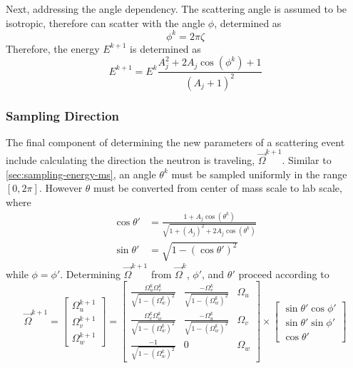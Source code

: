 Next, addressing the angle dependency. The scattering angle is assumed to be isotropic, therefore can scatter with the angle $\phi$, determined as
\begin{equation}
    \phi^k = 2\pi\zeta
\end{equation}
Therefore, the energy $E^{k+1}$ is determined as
\begin{equation}
    E^{k+1} = E^{k} \frac{A_j^{2} + 2A_{j}\cos{\left(\phi^{k}\right) + 1}}{\left( A_{j} + 1 \right)^2}
\end{equation}

\subsubsection{Sampling Direction}
The final component of determining the new parameters of a scattering event include calculating the direction the neutron is traveling, $\overrightarrow{\Omega}^{k+1}$. Similar to \autoref{sec:sampling-energy-ms}, an angle $\theta^k$ must be sampled uniformly in the range $[0,2\pi]$. However $\theta$ must be converted from center of mass scale to lab scale, where
\begin{align}
    \cos{\theta'} &= \frac{1 + A_j \cos{\left( \theta^k \right)}}{\sqrt{1 + \left( A_j\right)^2 + 2A_j\cos{\left(\theta^k \right)}}} \\
    \sin{\theta'} &= \sqrt{1 - \left( \cos{\theta'} \right)^2}
\end{align}
while $\phi=\phi'$.
Determining $\overrightarrow{\Omega}^{k+1}$ from $\overrightarrow{\Omega}^{k}$, $\phi'$, and $\theta'$ proceed according to
\begin{equation}
    \label{eq:direction-calculation-ms}
    \overrightarrow{\Omega}^{k+1} = \begin{bmatrix}
        \Omega^{k+1}_u \\[8pt]
        \Omega^{k+1}_v \\[8pt]
        \Omega^{k+1}_w
    \end{bmatrix}
    = \begin{bmatrix}
        \frac{\Omega_{u}^{k} \Omega_{v}^{k}} { \sqrt{1 - \left(\Omega_{w}^{k}\right)^2 }} &
        \frac{-\Omega_v^k} { \sqrt{1 - \left(\Omega_{w}^{k}\right)^2 }} &
        \Omega_u \\[10pt]
        \frac{\Omega_{v}^{k} \Omega_{w}^{k}} { \sqrt{1 - \left(\Omega_{w}^{k}\right)^2 }} &
        \frac{-\Omega_u^k} { \sqrt{1 - \left(\Omega_{w}^{k}\right)^2 }} &
        \Omega_v \\[10pt]
        \frac{-1} { \sqrt{1 - \left(\Omega_{w}^{k}\right)^2 }} &
        0 &
        \Omega_w
    \end{bmatrix} \times
    \begin{bmatrix}
        \sin{\theta'}\cos{\phi'} \\[8pt]
        \sin{\theta'}\sin{\phi'} \\[8pt]
        \cos{\theta'}
    \end{bmatrix}
\end{equation}
